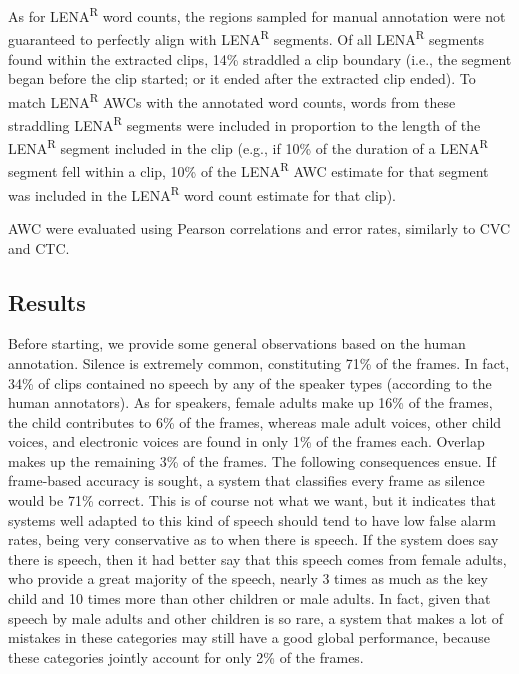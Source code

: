 \documentclass[english,table,man,floatsintext]{apa6}
\begin{document}
As for LENA\textsuperscript{R} word counts, the regions sampled for manual annotation were not guaranteed to perfectly align with LENA\textsuperscript{R} segments. Of all LENA\textsuperscript{R} segments found within the extracted clips, 14\% straddled a clip boundary (i.e., the segment began before the clip started; or it ended after the extracted clip ended). To match LENA\textsuperscript{R} AWCs with the annotated word counts, words from these straddling LENA\textsuperscript{R} segments were included in proportion to the length of the LENA\textsuperscript{R} segment included in the clip (e.g., if 10\% of the duration of a LENA\textsuperscript{R} segment fell within a clip, 10\% of the LENA\textsuperscript{R} AWC estimate for that segment was included in the LENA\textsuperscript{R} word count estimate for that clip).

AWC were evaluated using Pearson correlations and error rates, similarly to CVC and CTC.

\hypertarget{results}{%
\subsection{Results}\label{results}}

Before starting, we provide some general observations based on the human annotation. Silence is extremely common, constituting 71\% of the frames. In fact, 34\% of clips contained no speech by any of the speaker types (according to the human annotators). As for speakers, female adults make up 16\% of the frames, the child contributes to 6\% of the frames, whereas male adult voices, other child voices, and electronic voices are found in only 1\% of the frames each. Overlap makes up the remaining 3\% of the frames. The following consequences ensue. If frame-based accuracy is sought, a system that classifies every frame as silence would be 71\% correct. This is of course not what we want, but it indicates that systems well adapted to this kind of speech should tend to have low false alarm rates, being very conservative as to when there is speech. If the system does say there is speech, then it had better say that this speech comes from female adults, who provide a great majority of the speech, nearly 3 times as much as the key child and 10 times more than other children or male adults. In fact, given that speech by male adults and other children is so rare, a system that makes a lot of mistakes in these categories may still have a good global performance, because these categories jointly account for only 2\% of the frames.
\end{document}
